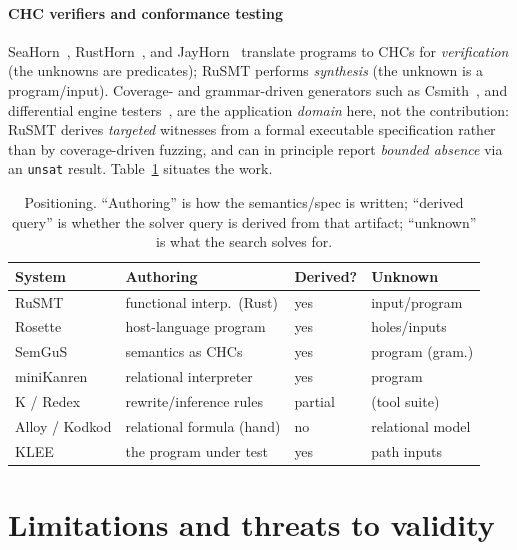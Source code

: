 \documentclass[sigplan,review,anonymous]{acmart}
\theoremstyle{definition}
\theoremstyle{remark}
\newcommand{\rusmt}{RuSMT}
\newcommand{\code}[1]{\texttt{#1}}
\begin{document}
\paragraph{CHC verifiers and conformance testing}
SeaHorn~\cite{gurfinkel2015seahorn}, RustHorn~\cite{matsushita2020rusthorn}, and
JayHorn~\cite{kahsai2016jayhorn} translate programs to CHCs for
\emph{verification} (the unknowns are predicates); \rusmt{} performs
\emph{synthesis} (the unknown is a program/input). Coverage- and grammar-driven
generators such as Csmith~\cite{yang2011csmith}, and differential engine
testers~\cite{park2021jest,ye2021comfort}, are the application \emph{domain} here,
not the contribution: \rusmt{} derives \emph{targeted} witnesses from a formal
executable specification rather than by coverage-driven fuzzing, and can in
principle report \emph{bounded absence} via an \code{unsat} result.
Table~\ref{tab:position} situates the work.

\begin{table}[t]
\centering
\caption{Positioning. ``Authoring'' is how the semantics/spec is written;
``derived query'' is whether the solver query is derived from that artifact;
``unknown'' is what the search solves for.}
\label{tab:position}
\small
\setlength{\tabcolsep}{3.5pt}
\begin{tabular}{@{}llll@{}}
\toprule
System & Authoring & Derived? & Unknown\\
\midrule
\rusmt{}       & functional interp.\ (Rust) & yes & input/program\\
Rosette        & host-language program      & yes & holes/inputs\\
SemGuS         & semantics as CHCs          & yes & program (gram.)\\
miniKanren     & relational interpreter     & yes & program\\
K / Redex      & rewrite/inference rules    & partial & (tool suite)\\
Alloy / Kodkod & relational formula (hand)  & no  & relational model\\
KLEE           & the program under test     & yes & path inputs\\
\bottomrule
\end{tabular}
\end{table}

\section{Limitations and threats to validity}
\label{sec:limits}
\end{document}
